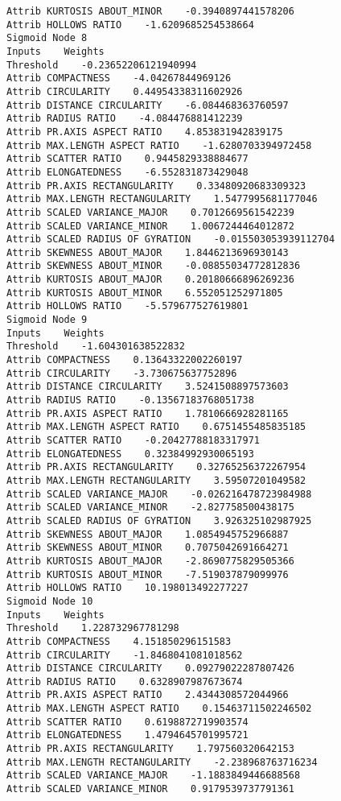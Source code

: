\documentclass[
	article,			%
	11pt,				%
	oneside,			%
	a4paper,			%
	english,			%
	brazil,				%
	sumario=tradicional
	]{abntex2}
\begin{document}
\begin{lstlisting}
Attrib KURTOSIS ABOUT_MINOR    -0.3940897441578206
Attrib HOLLOWS RATIO    -1.6209685254538664
Sigmoid Node 8
Inputs    Weights
Threshold    -0.23652206121940994
Attrib COMPACTNESS    -4.04267844969126
Attrib CIRCULARITY    0.44954338311602926
Attrib DISTANCE CIRCULARITY    -6.084468363760597
Attrib RADIUS RATIO    -4.084476881412239
Attrib PR.AXIS ASPECT RATIO    4.853831942839175
Attrib MAX.LENGTH ASPECT RATIO    -1.6280703394972458
Attrib SCATTER RATIO    0.9445829338884677
Attrib ELONGATEDNESS    -6.552831873429048
Attrib PR.AXIS RECTANGULARITY    0.33480920683309323
Attrib MAX.LENGTH RECTANGULARITY    1.5477995681177046
Attrib SCALED VARIANCE_MAJOR    0.7012669561542239
Attrib SCALED VARIANCE_MINOR    1.0067244464012872
Attrib SCALED RADIUS OF GYRATION    -0.015503053939112704
Attrib SKEWNESS ABOUT_MAJOR    1.8446213696930143
Attrib SKEWNESS ABOUT_MINOR    -0.08855034772812836
Attrib KURTOSIS ABOUT_MAJOR    0.20180666896269236
Attrib KURTOSIS ABOUT_MINOR    6.552051252971805
Attrib HOLLOWS RATIO    -5.579677527619801
Sigmoid Node 9
Inputs    Weights
Threshold    -1.604301638522832
Attrib COMPACTNESS    0.13643322002260197
Attrib CIRCULARITY    -3.730675637752896
Attrib DISTANCE CIRCULARITY    3.5241508897573603
Attrib RADIUS RATIO    -0.13567183768051738
Attrib PR.AXIS ASPECT RATIO    1.7810666928281165
Attrib MAX.LENGTH ASPECT RATIO    0.6751455485835185
Attrib SCATTER RATIO    -0.20427788183317971
Attrib ELONGATEDNESS    0.32384992930065193
Attrib PR.AXIS RECTANGULARITY    0.32765256372267954
Attrib MAX.LENGTH RECTANGULARITY    3.59507201049582
Attrib SCALED VARIANCE_MAJOR    -0.026216478723984988
Attrib SCALED VARIANCE_MINOR    -2.827758500438175
Attrib SCALED RADIUS OF GYRATION    3.926325102987925
Attrib SKEWNESS ABOUT_MAJOR    1.0854945752966887
Attrib SKEWNESS ABOUT_MINOR    0.7075042691664271
Attrib KURTOSIS ABOUT_MAJOR    -2.8690775829505366
Attrib KURTOSIS ABOUT_MINOR    -7.519037879099976
Attrib HOLLOWS RATIO    10.198013492277227
Sigmoid Node 10
Inputs    Weights
Threshold    1.228732967781298
Attrib COMPACTNESS    4.151850296151583
Attrib CIRCULARITY    -1.8468041081018562
Attrib DISTANCE CIRCULARITY    0.09279022287807426
Attrib RADIUS RATIO    0.6328907987673674
Attrib PR.AXIS ASPECT RATIO    2.4344308572044966
Attrib MAX.LENGTH ASPECT RATIO    0.15463711502246502
Attrib SCATTER RATIO    0.6198872719903574
Attrib ELONGATEDNESS    1.4794645701995721
Attrib PR.AXIS RECTANGULARITY    1.797560320642153
Attrib MAX.LENGTH RECTANGULARITY    -2.238968763716234
Attrib SCALED VARIANCE_MAJOR    -1.1883849446688568
Attrib SCALED VARIANCE_MINOR    0.9179539737791361

\end{lstlisting}
\end{document}
